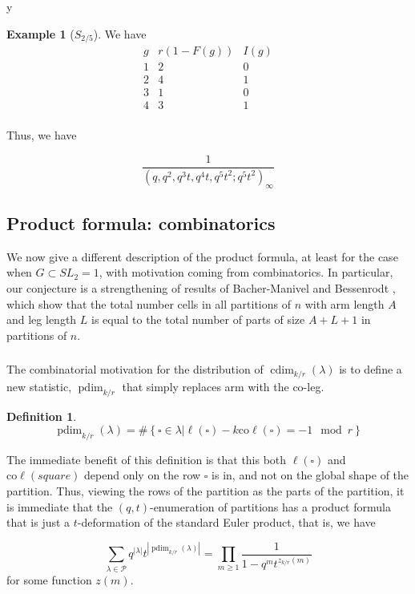 y\documentclass{amsart}[12pt]
\theoremstyle{definition}
\newtheorem{example}[dummy]{Example}
\newtheorem{definition}[dummy]{Definition}
\newcommand{\PP}{\mathcal{P}} %
\newcommand{\coleg}{\text{co}\ell}
\DeclareMathOperator{\dusty}{pdim}
\DeclareMathOperator{\cdim}{cdim}
\begin{document}
\begin{example}[$S_{2/5}$]
We have
$$\begin{array}{r|c|l}
g & r(1-F(g)) & I(g) \\
\hline
1 & 2 & 0 \\
2 & 4 & 1 \\
3 & 1 & 0 \\
4 & 3 & 1 \\
\end{array}
$$

Thus, we have


$$
\frac{1}{(q, q^2,q^3t, q^4t, q^5t^2; q^5t^2)_\infty}
$$
\end{example}


\subsection{Product formula: combinatorics}
\label{sec:prod-comb}

We now give a different description of the product formula, at least for the case when $G\subset SL_2=1$, with motivation coming from combinatorics.  In particular, our conjecture is a strengthening of results of Bacher-Manivel \cite{BM} and Bessenrodt \cite{Bess}, which show that the total number cells in all partitions of $n$ with arm length $A$ and leg length $L$ is equal to the total number of parts of size $A+L+1$ in partitions of $n$.

\subsubsection{ }

The combinatorial motivation for the distribution of $\cdim_{k/r}(\lambda)$ is to define a new statistic, $\dusty_{k/r}$ that simply replaces arm with the co-leg.
\begin{definition}
$$\dusty_{k/r}(\lambda)=\#\left\{\square\in\lambda\Big| \ell(\square)-k\coleg(\square)=-1\mod r\right\}$$
\end{definition}

The immediate benefit of this definition is that this both $\ell(\square)$ and $\coleg(square)$ depend only on the row $\square$ is in, and not on the global shape of the partition.  Thus, viewing the rows of the partition as the parts of the partition, it is immediate that the $(q,t)$-enumeration of partitions has a product formula that is just a $t$-deformation of the standard Euler product, that is, we have

$$\sum_{\lambda\in \PP} q^{|\lambda|} t^{|\dusty_{k/r}(\lambda)|}=\prod_{m\geq 1} \frac{1}{1-q^mt^{z_{k/r}(m)}}$$
for some function $z(m)$.
\end{document}

